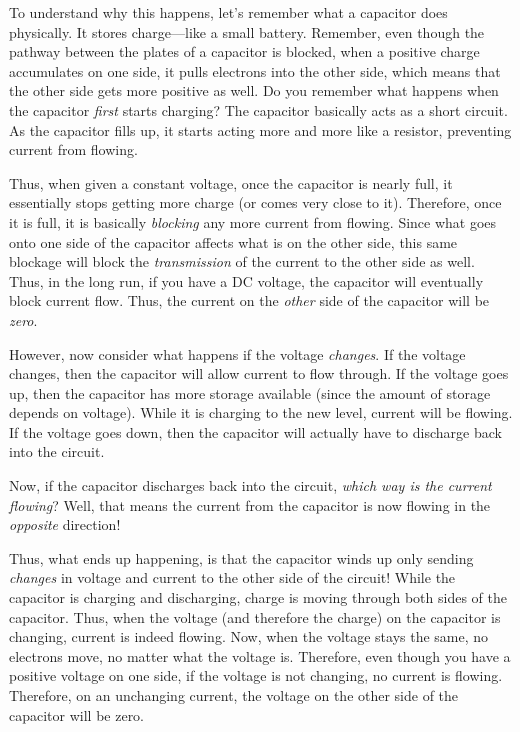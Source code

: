 To understand why this happens, let's remember what a capacitor does physically.
It stores charge---like a small battery.
Remember, even though the pathway between the plates of a capacitor is blocked, when a positive charge accumulates on one side, it pulls electrons into the other side, which means that the other side gets more positive as well.
Do you remember what happens when the capacitor \emph{first} starts charging?
The capacitor basically acts as a short circuit.
As the capacitor fills up, it starts acting more and more like a resistor, preventing current from flowing.

Thus, when given a constant voltage, once the capacitor is nearly full, it essentially stops getting more charge (or comes very close to it).  
Therefore, once it is full, it is basically \emph{blocking} any more current from flowing.
Since what goes onto one side of the capacitor affects what is on the other side, this same blockage will block the \emph{transmission} of the current to the other side as well.
Thus, in the long run, if you have a DC voltage, the capacitor will eventually block current flow.
Thus, the current on the \emph{other} side of the capacitor will be \emph{zero}.

However, now consider what happens if the voltage \emph{changes}.
If the voltage changes, then the capacitor will allow current to flow through.
If the voltage goes up, then the capacitor has more storage available (since the amount of storage depends on voltage).
While it is charging to the new level, current will be flowing.
If the voltage goes down, then the capacitor will actually have to discharge back into the circuit.

Now, if the capacitor discharges back into the circuit, \emph{which way is the current flowing}?
Well, that means the current from the capacitor is now flowing in the \emph{opposite} direction!

Thus, what ends up happening, is that the capacitor winds up only sending \emph{changes} in voltage and current to the other side of the circuit!
While the capacitor is charging and discharging, charge is moving through both sides of the capacitor.  
Thus, when the voltage (and therefore the charge) on the capacitor is changing, current is indeed flowing.
Now, when the voltage stays the same, no electrons move, no matter what the voltage is.
Therefore, even though you have a positive voltage on one side, if the voltage is not changing, no current is flowing.
Therefore, on an unchanging current, the voltage on the other side of the capacitor will be zero.

